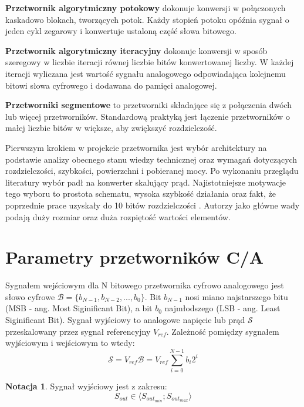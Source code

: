 \documentclass[10pt,a4paper,twoside]{report}
\theoremstyle{definition}
\newtheorem{notation}{Notacja}[section]
\theoremstyle{definition}
\theoremstyle{definition}
\theoremstyle{definition}
\theoremstyle{definition}
\begin{document}
	{	\textbf{Przetwornik algorytmiczny potokowy} dokonuje konwersji w połączonych kaskadowo blokach, tworzących potok. Każdy stopień potoku opóźnia sygnał o jeden cykl zegarowy i konwertuje ustaloną część słowa bitowego.}

	{	\textbf{Przetwornik algorytmiczny iteracyjny} dokonuje konwersji w sposób szeregowy w liczbie iteracji równej liczbie bitów konwertowanej liczby. W każdej iteracji wyliczana jest wartość sygnału analogowego odpowiadająca kolejnemu bitowi słowa cyfrowego i dodawana do pamięci analogowej.

	{ 	\textbf{Przetworniki segmentowe} to przetworniki składające się z połączenia dwóch lub więcej przetworników. Standardową praktyką jest łączenie przetworników o małej liczbie bitów w większe, aby zwiększyć rozdzielczość. }

	{	Pierwszym krokiem w projekcie przetwornika jest wybór architektury na podstawie analizy obecnego stanu wiedzy technicznej oraz wymagań dotyczących rozdzielczości, szybkości, powierzchni i pobieranej mocy. Po wykonaniu przeglądu literatury wybór padł na konwerter skalujący prąd. Najistotniejsze motywacje tego wyboru to prostota schematu, wysoka szybkość działania \cite{cmosanal} oraz fakt, że poprzednie prace uzyskały do 10 bitów rozdzielczości \cite{plassche}.	Autorzy \cite{cmosanal} jako główne wady podają duży rozmiar oraz duża rozpiętość wartości elementów.}
	
	\section{Parametry przetworników C/A}
	{	Sygnałem wejściowym dla N bitowego przetwornika cyfrowo analogowego jest słowo cyfrowe $\mathcal{B}=\{b_{N-1},b_{N-2},...,b_0\}$. Bit $b_{N-1}$ nosi miano najstarszego bitu (MSB - ang. Most Siginificant Bit), a bit $b_0$ najmłodszego (LSB - ang. Least Siginificant Bit). Sygnał wyjściowy to analogowe napięcie lub prąd $\mathcal{S}$ przeskalowany przez sygnał referencyjny $V_{ref}$. Zależność pomiędzy sygnałem wyjściowym i wejściowym to wtedy:
		\begin{equation}
		\mathcal{S} = V_{ref}\mathcal{B} = V_{ref} {\sum_{i=0}^{N-1} b_i2^i}
		\end{equation}	}
	
	\begin{notation}{Sygnał wyjściowy jest z zakresu:}
		$$
		S_{out} \in \langle S_{out_{min}} ;  S_{out_{max}} \rangle
		$$
	\end{notation}
	
}
\end{document}

